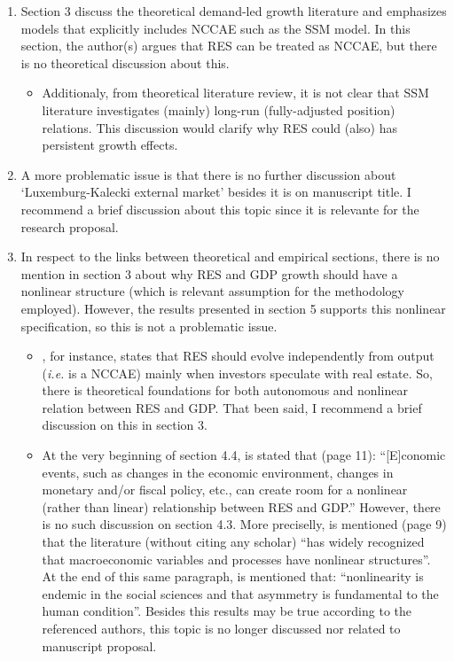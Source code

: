 \documentclass[11pt]{article}
\begin{document}
\begin{enumerate}
\item Section 3 discuss the theoretical demand-led growth literature and emphasizes models that explicitly includes NCCAE such as the SSM model. In this section, the author(s) argues that RES can be treated as NCCAE, but there is no theoretical discussion about this.

\begin{itemize}
\item Additionaly, from theoretical literature review, it is not clear that SSM literature investigates (mainly) long-run (fully-adjusted position) relations. This discussion would clarify why RES could (also) has persistent growth effects.
\end{itemize}

\item A more problematic issue is that there is no further discussion about `Luxemburg-Kalecki external market' besides it is on manuscript title. I recommend a brief discussion about this topic since it is relevante for the research proposal.

\item In respect to the links between theoretical and empirical sections, there is no mention in section 3 about why RES and GDP growth should have a nonlinear structure (which is relevant assumption for the methodology employed). However, the results presented in section 5 supports this nonlinear specification, so this is not a problematic issue.

\begin{itemize}
\item \textcite{duesenberry_investment_1958}, for instance, states that RES should evolve independently from output (\emph{i.e.} is a NCCAE) mainly when investors speculate with real estate. So, there is theoretical foundations for both autonomous and nonlinear relation between RES and GDP. That been said, I recommend a brief discussion on this in section 3.

\item At the very beginning of section 4.4, is stated that (page 11): ``[E]conomic events, such as changes in the economic environment, changes in monetary and/or fiscal policy, etc., can create room for a nonlinear (rather than linear) relationship between RES and GDP.'' However, there is no such discussion on section 4.3. More preciselly, is mentioned (page 9) that the literature (without citing any scholar) ``has widely recognized that macroeconomic variables and processes have nonlinear structures''. At the end of this same paragraph, is mentioned that: ``nonlinearity is endemic in the social sciences and that asymmetry is fundamental to the human condition''. Besides this results may be true according to the referenced authors, this topic is no longer discussed nor related to manuscript proposal.
\end{itemize}


\end{enumerate}
\end{document}
